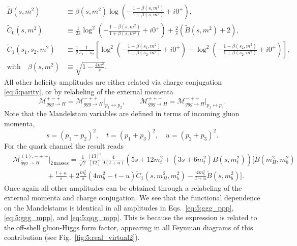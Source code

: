 \begin{equation}
\begin{split}
\tilde{B}\!(s, m^2) &\equiv \beta(s, m^2) \log\!\left(- \frac{1 - \beta(s, m^2)}{1 + \beta(s, m^2)} + i 0^+ \right), \\
\tilde{C}_0\!(s, m^2) &\equiv \frac{1}{2 s} \log^2\!\left(- \frac{1 - \beta(s, m^2)}{1 + \beta(s, m^2)} + i 0^+ \right) + \frac{2}{s} \left(\tilde{B}\!(s, m^2) + 2 \right), \\
\tilde{C}_1\!(s_1, s_2, m^2) &\equiv \frac{1}{2} \frac{1}{s_1 - s_2} \left[ \log^2\!\left(-\frac{1 - \beta(s_1, m^2)}{1 + \beta(s_2, m^2)} + i 0^+ \right) - \log^2\!\left(- \frac{1 - \beta(s_2, m^2)}{1 + \beta(s_2, m^2)} + i0^+\right) \right], \\
\text{with} \quad \beta(s, m^2) &\equiv \sqrt{1 - \frac{4 m^2}{s}}.
\label{eq:5:function_definitions}
\end{split}
\end{equation}
All other helicity amplitudes are either related via charge conjugation \eqref{eq:5:parity}, or by relabeling of the external momenta
\begin{equation}
\mathcal{M}_{ggg \rightarrow H}^{+-+} = \mathcal{M}_{ggg \rightarrow H}^{-++} \bigg \vert_{p_1 \leftrightarrow p_2}, \qquad \mathcal{M}_{ggg \rightarrow H}^{++-} = \mathcal{M}_{ggg \rightarrow H}^{-++} \bigg \vert_{p_1 \leftrightarrow p_3}.
\end{equation}
Note that the Mandelstam variables are defined in terms of incoming gluon momenta, \ie\
\begin{equation}
s = (p_1 + p_2)^2, \quad t = (p_1 + p_3)^2, \quad u = (p_2 + p_3)^2.
\end{equation}
For the quark channel the result reads
\begin{equation}
\begin{split}
&\mathcal{M}_{\bar{q}q g \rightarrow H}^{(1),-++} \bigg \vert_{2\, \text{masses}} =  \frac{1}{\sqrt{2}} \frac{[13]^2}{[12]}  \frac{4 }{9 (t + u)} \left(5 s + 12 m_t^2 + (3 s + 6 m_t^2) \tilde{B}\!(s, m_t^2) \right)\bigg [\tilde{B}\!(m_H^2, m_b^2) \\
& \hspace{2cm}  + \frac{t + u}{s} + 2 \frac{m_b^2}{s} \left(4m_b^2 - t - u  \right) \tilde{C}_1\!(s, m_H^2, m_b^2) - \frac{4 m_b^2}{t + u}\tilde{B}\!(s, m_b^2) \bigg ].
\label{eq:5:qqg_mpp}
\end{split}
\end{equation}
Once again all other amplitudes can be obtained through a relabeling of the external momenta and charge conjugation. We see that the functional dependence on the Mandelstams is identical in all amplitudes in Eqs.~\eqref{eq:5:ggg_ppp}, \eqref{eq:5:ggg_mpp}, and \eqref{eq:5:qqg_mpp}. This is because the expression is related to the off-shell gluon-Higgs form factor, appearing in all Feynman diagrams of this contribution (see Fig.~\ref{fig:5:real_virtual2}).

